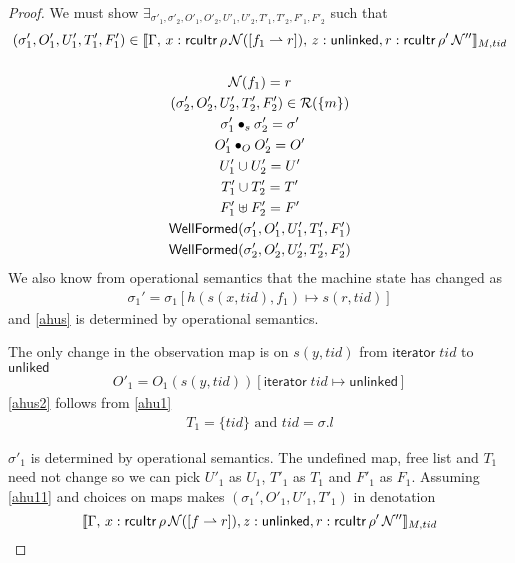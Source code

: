 \begin{proof}
We must show  $\exists_{\sigma'_1,\sigma'_2, O'_{1}, O'_{2}, U'_{1}, U'_{2}, T'_{1}, T'_{2}, F'_1,F'_2}$ such that
\begin{gather}\label{phu5}
\begin{aligned}
(\sigma_1',O'_{1},U'_{1}, T'_{1},F'_1)  \in \llbracket \Gamma, \,  x:\mathsf{rcuItr} \, \rho \,\mathcal{N}([f_1 \rightharpoonup r]) ,\, z:\mathsf{unlinked}, r:\mathsf{rcuItr} \, \rho' \, \mathcal{N}'' \rrbracket_{M,tid}
\end{aligned}\\
\\
\label{phuN}
\mathcal{N}(f_1)= r
\\
\label{phu6}
(\sigma_2',O'_{2},U'_{2}, T'_{2}, F'_2) \in \mathcal{R}(\{m\})
\\
\label{ahusig'}
\sigma'_1 \bullet_s \sigma'_2 = \sigma' \\
\label{phu7}
O'_{1} \bullet_{O} O'_{2} = O'
\\
\label{phu8}
U'_{1} \cup U'_{2} = U'
\\
\label{phu9}
T'_{1} \cup T'_{2} = T'
\\
\label{phff}
F'_{1} \uplus F'_2 = F'
\\
\label{phu10}
\textsf{WellFormed}(\sigma_1',O'_{1},U'_{1},T'_{1},F'_1) \\
\label{phu11}
\textsf{WellFormed}(\sigma_2',O'_{2},U'_{2},T'_{2},F'_2)
\end{gather}
We also know from operational semantics that the machine state has changed as
\begin{gather}\label{ahus}
\sigma_1' =  \sigma_1[h(s(x,tid),f_1 ) \mapsto s(r,tid) ]
\end{gather}
and \ref{ahus} is determined by operational semantics. 

The only change in the observation map is on $s(y,tid)$ from $\textsf{iterator}\;tid$ to $\textsf{unliked}$
\begin{gather}\label{ahus1}
  O'_1 =  O_1(s(y,tid))[\textsf{iterator}\;tid \mapsto \textsf{unlinked}]
\end{gather}
\ref{ahus2} follows from \ref{ahu1}
\begin{gather}\label{ahus2}
  T_1 = \{tid\} \text{ and } tid = \sigma.l
\end{gather}

$\sigma'_1$ is determined by operational semantics. The undefined map, free list and $T_1$ need not change so we can pick $U'_1$ as $U_1$, $T'_1$ as $T_1$ and $F'_1$ as $F_1$. Assuming \ref{ahu11} and choices on maps makes $(\sigma_1',O'_{1},U'_{1}, T'_{1})$ in denotation
\[\llbracket \Gamma, \,  x:\mathsf{rcuItr} \, \rho \,\mathcal{N}([ f \rightharpoonup r]), z:\mathsf{unlinked}, r:\mathsf{rcuItr} \, \rho' \, \mathcal{N}'' \rrbracket_{M,tid}\]


\end{proof}
